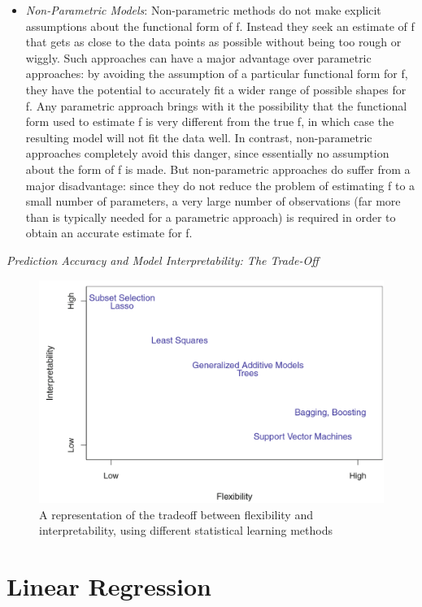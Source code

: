 \documentclass[12pt,a4paper]{article}
\begin{document}
\begin{itemize}
\item \textit{Non-Parametric Models}: Non-parametric methods do not make explicit assumptions about the functional form of f. Instead they seek an estimate of f that gets as close to the data points as possible without being too rough or wiggly. Such approaches can have a major advantage over parametric approaches: by avoiding the assumption of a particular functional form for f, they have the potential to accurately fit a wider range of possible shapes for f. Any parametric approach brings with it the possibility that the functional form used to estimate f is very different from the true f, in which case the resulting model will not fit the data well. In contrast, non-parametric approaches completely avoid this danger, since essentially no assumption about the form of f is made. But non-parametric approaches do suffer from a major disadvantage: since they do not reduce the problem of estimating f to a small number of parameters, a very large number of observations (far more than is typically needed for a parametric approach) is required in order to obtain an accurate estimate for f.
\end{itemize}
\newpage
\textit{Prediction Accuracy and Model Interpretability: The Trade-Off}
\begin{figure}[hbtp]
\centering
\includegraphics[scale=0.5]{F1.png}
\caption{A representation of the tradeoﬀ between ﬂexibility and interpretability, using diﬀerent statistical learning methods}
\end{figure}

\section{Linear Regression}
\end{document}
